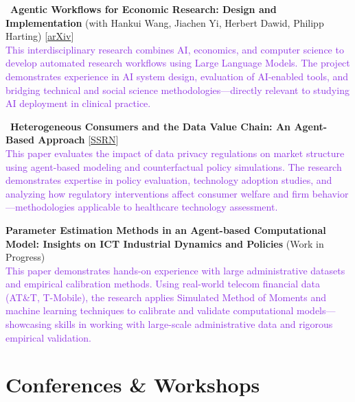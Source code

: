 \documentclass[a4paper,12pt]{article}
\begin{document}
\textbullet\ \textbf{Agentic Workflows for Economic Research: Design and Implementation} (with Hankui Wang, Jiachen Yi, Herbert Dawid, Philipp Harting) [\href{https://arxiv.org/abs/2504.09736}{arXiv}]\\ [1.5ex]
\textcolor{BlueViolet}{This interdisciplinary research combines AI, economics, and computer science to develop automated research workflows using Large Language Models. The project demonstrates experience in AI system design, evaluation of AI-enabled tools, and bridging technical and social science methodologies—directly relevant to studying AI deployment in clinical practice.}

\textbullet\ \textbf{Heterogeneous Consumers and the Data Value Chain: An Agent-Based Approach} [\href{https://papers.ssrn.com/sol3/papers.cfm?abstract_id=5235196}{SSRN}]\\ [1.5ex]
\textcolor{BlueViolet}{This paper evaluates the impact of data privacy regulations on market structure using agent-based modeling and counterfactual policy simulations. The research demonstrates expertise in policy evaluation, technology adoption studies, and analyzing how regulatory interventions affect consumer welfare and firm behavior—methodologies applicable to healthcare technology assessment.}

\textbullet \;\textbf{Parameter Estimation Methods in an Agent-based Computational Model: Insights on ICT Industrial Dynamics and Policies} (Work in Progress)\\ [1.5ex]
\textcolor{BlueViolet}{This paper demonstrates hands-on experience with large administrative datasets and empirical calibration methods. Using real-world telecom financial data (AT\&T, T-Mobile), the research applies Simulated Method of Moments and machine learning techniques to calibrate and validate computational models—showcasing skills in working with large-scale administrative data and rigorous empirical validation.}

\section{Conferences \& Workshops}




\end{document}
